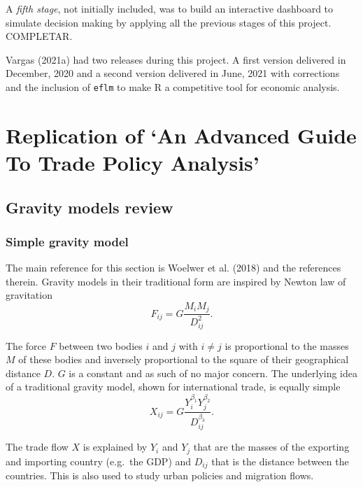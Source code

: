 \documentclass[12pt,reqno,oneside,pdftex]{formato-puc/puctesis} %
\begin{document}
A \emph{fifth stage}, not initially included, was to build an
interactive dashboard to simulate decision making by applying all the
previous stages of this project. COMPLETAR.

Vargas (2021a) had two releases during this project. A first version
delivered in December, 2020 and a second version delivered in June, 2021
with corrections and the inclusion of \texttt{eflm} to make R a
competitive tool for economic analysis.

\chapter{Replication of `An Advanced Guide To Trade Policy Analysis'}

\hypertarget{gravity-models-review}{%
\section{Gravity models review}\label{gravity-models-review}}

\hypertarget{simple-gravity-model}{%
\subsection{Simple gravity model}\label{simple-gravity-model}}

The main reference for this section is Woelwer et al. (2018) and the
references therein. Gravity models in their traditional form are
inspired by Newton law of gravitation \begin{equation}
F_{ij}=G\frac{M_{i}M_{j}}{D^{2}_{ij}}.
\end{equation}

The force \(F\) between two bodies \(i\) and \(j\) with \(i \neq j\) is
proportional to the masses \(M\) of these bodies and inversely
proportional to the square of their geographical distance \(D\). \(G\)
is a constant and as such of no major concern. The underlying idea of a
traditional gravity model, shown for international trade, is equally
simple \begin{equation}
X_{ij}=G\frac{Y_{i}^{\beta_{1}}Y_{j}^{\beta_{2}}}{D_{ij}^{\beta_{3}}}.
\end{equation}

The trade flow \(X\) is explained by \(Y_{i}\) and \(Y_{j}\) that are
the masses of the exporting and importing country (e.g.~the GDP) and
\(D_{ij}\) that is the distance between the countries. This is also used
to study urban policies and migration flows.
\end{document}
